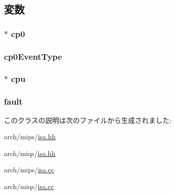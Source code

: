 \subsection{変数}
\hypertarget{classMipsISA_1_1ISA_1_1CP0Event_ae159fdf8262db4f0694422aa1d3c6d81}{
\subsubsection[{cp0}]{ $\ast$ {\bf cp0}}}
\label{classMipsISA_1_1ISA_1_1CP0Event_ae159fdf8262db4f0694422aa1d3c6d81}
\hypertarget{classMipsISA_1_1ISA_1_1CP0Event_ac74bfe0d0d55cfd34a00200ffd9fe744}{
\subsubsection[{cp0EventType}]{ {\bf cp0EventType}}}
\label{classMipsISA_1_1ISA_1_1CP0Event_ac74bfe0d0d55cfd34a00200ffd9fe744}
\hypertarget{classMipsISA_1_1ISA_1_1CP0Event_add0eb5e06b5f70ce354db415a720abc4}{
\subsubsection[{cpu}]{ $\ast$ {\bf cpu}}}
\label{classMipsISA_1_1ISA_1_1CP0Event_add0eb5e06b5f70ce354db415a720abc4}
\hypertarget{classMipsISA_1_1ISA_1_1CP0Event_a68714ceb74c60ea7ef5dec335bb6c5d7}{
\subsubsection[{fault}]{ {\bf fault}}}
\label{classMipsISA_1_1ISA_1_1CP0Event_a68714ceb74c60ea7ef5dec335bb6c5d7}


このクラスの説明は次のファイルから生成されました:\begin{DoxyCompactItemize}
\item 
arch/mips/\hyperlink{mips_2isa_8hh}{isa.hh}\item 
arch/miqs/\hyperlink{miqs_2isa_8hh}{isa.hh}\item 
arch/mips/\hyperlink{mips_2isa_8cc}{isa.cc}\item 
arch/miqs/\hyperlink{miqs_2isa_8cc}{isa.cc}\end{DoxyCompactItemize}
